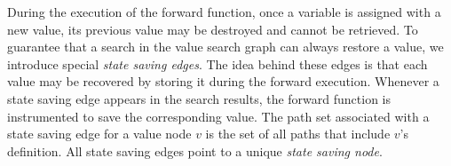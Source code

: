 \documentclass[12pt]{gatech-thesis}
\begin{document}
During the execution of the forward function, once a variable is assigned with a new value, its previous value may be destroyed and cannot be retrieved. To guarantee that a search in the value search graph can always restore a value, we introduce special \emph{state saving edges}. 
The idea behind these edges is that each value may be recovered by storing it during the forward execution. 
Whenever a state saving edge appears in the search results, the forward function is instrumented to save the corresponding value. 
The path set associated with a state saving edge for a value node $v$ is the set of all paths that include $v$'s definition. All state saving edges point to a unique \emph{state saving node}. %

\end{document}
